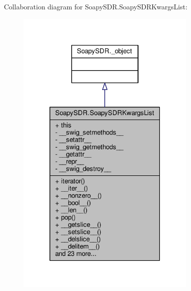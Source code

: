 Collaboration diagram for Soapy\+S\+D\+R.\+Soapy\+S\+D\+R\+Kwargs\+List\+:
\nopagebreak
\begin{figure}[H]
\begin{center}
\leavevmode
\includegraphics[width=247pt]{d2/d28/classSoapySDR_1_1SoapySDRKwargsList__coll__graph}
\end{center}
\end{figure}
